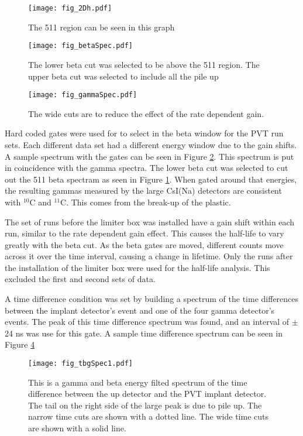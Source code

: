 \begin{figure}[!htb]
	\centerline{\texttt{[image: fig\_2Dh.pdf]}}
	\caption{The 511 region can be seen in this graph}
	\label{fig:2DGraph}
\end{figure}

\begin{figure}[!htb]
	\centerline{\texttt{[image: fig\_betaSpec.pdf]}}
	\caption{The lower beta cut was selected to be above the 511 region.
		 The upper beta cut was selected to include all the pile up}
	
	\label{fig:BetaGraph}
\end{figure}

\begin{figure}[!htb]
	\centerline{\texttt{[image: fig\_gammaSpec.pdf]}}
	\caption{The wide cuts are to reduce the effect of the rate dependent gain.}
	\label{fig:GammaGraph}
\end{figure}

Hard coded gates were used for to select in the beta window for the PVT run sets.
Each different data set had a different energy window due to the gain shifts.
A sample spectrum with the gates can be seen in Figure \ref{fig:BetaGraph}.
This spectrum is put in coincidence with the gamma spectra. 
The lower beta cut was selected to cut out the 511 beta spectram as seen in Figure \ref{fig:2DGraph}.
When gated around that energies, the resulting gammas measured by the large CsI(Na) detectors are consistent with $^{10}$C and $^{11}$C.
This comes from the break-up of the plastic. 

The set of runs before the limiter box was installed have a gain shift within each run, similar to the rate dependent gain effect.
This causes the half-life to vary greatly with the beta cut.
As the beta gates are moved, different counts move across it over the time interval, causing a change in lifetime. 
Only the runs after the installation of the limiter box were used for the half-life analysis. 
This excluded the first and second sets of data.

A time difference condition was set by building a spectrum of the time differences between the implant detector's event and one of the four gamma detector's events. 
The peak of this time difference spectrum was found, and an interval of $\pm$24 ns  was use for this gate.
A sample time difference spectrum can be seen in Figure \ref{fig:timediff}

\begin{figure}
	\centerline{\texttt{[image: fig\_tbgSpec1.pdf]}}	
	\caption{This is a gamma and beta energy filted spectrum of the time difference between the up detector and the PVT implant detector.
		The tail on the right side of the large peak is due to pile up.
		The narrow time cuts are shown with a dotted line.
		The wide time cuts are shown with a solid line.}
	\label{fig:timediff}
\end{figure}

